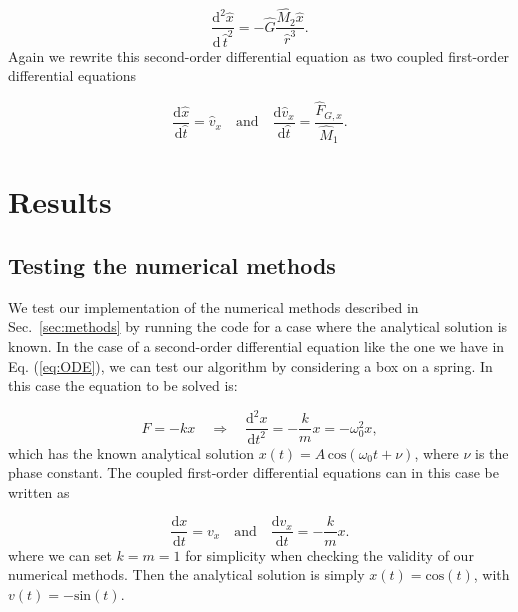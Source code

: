 \documentclass{article}
\begin{document}
\begin{multicols}{2}
\begin{equation}\label{eq:ODE_new}
	\frac{\mathrm{d}^2 \hat{x}}{\mathrm{d} \, \hat{t}^2} = - \hat{G} \frac{\hat{M_2} \hat{x}}{\hat{r}^3}.
\end{equation}
Again we rewrite this second-order differential equation as two coupled first-order differential equations

\begin{equation}
	\frac{\mathrm{d}\hat{x}}{\mathrm{d} \hat{t}} = \hat{v}_x  \quad \mathrm{and} \quad \frac{\mathrm{d}\hat{v}_x}{\mathrm{d}\hat{t}} = \frac{\hat{F}_{G,x}}{\hat{M}_1}.
\end{equation}






\section{Results}\label{sec:results}

\subsection{Testing the numerical methods}\label{sec:analytical_test}

We test our implementation of the numerical methods described in Sec.~\ref{sec:methods} by running the code for a case where the analytical solution is known. In the case of a second-order differential equation like the one we have in Eq. (\ref{eq:ODE}), we can test our algorithm by considering a box on a spring. In this case the equation to be solved is:

\begin{equation}
	F = -kx \quad \Rightarrow \quad \frac{\mathrm{d}^2 x}{\mathrm{d}t^2} = - \frac{k}{m}x = - \omega_0^2 x,
\end{equation}
which has the known analytical solution $x(t) = A \, \mathrm{cos}(\omega_0 t + \nu)$, where $\nu$ is the phase constant. The coupled first-order differential equations can in this case be written as

\begin{equation}
	\frac{\mathrm{d}x}{\mathrm{d}t} = v_x  \quad \mathrm{and} \quad \frac{\mathrm{d}v_x}{\mathrm{d}t} = - \frac{k}{m} x.
\end{equation}
where we can set $k = m = 1$ for simplicity when checking the validity of our numerical methods. Then the analytical solution is simply $x(t) = \mathrm{cos}(t)$, with $v(t) = - \mathrm{sin}(t)$.


\end{multicols}
\end{document}
